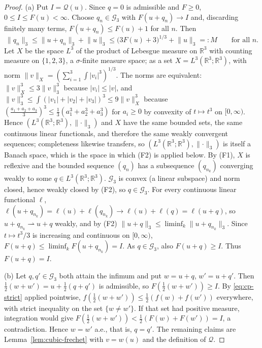 \documentclass[11pt]{article}
\theoremstyle{definition}
\theoremstyle{plain}
\newcommand{\R}{\mathbb R}
\newcommand{\norm}[1]{\lVert #1\rVert}
\begin{document}
\begin{proof}
(a) Put $I=\mathcal Q(u)$.  Since $q=0$ is admissible and $F\ge0$,
$0\le I\le F(u)<\infty$.  Choose $q_n\in\mathcal G_3$ with
$F(u+q_n)\to I$ and, discarding finitely many terms,
$F(u+q_n)\le F(u)+1$ for all $n$.  Then
\[
 \norm{q_n}_3\le\norm{u+q_n}_3+\norm u_3
 \le\bigl(3F(u)+3\bigr)^{1/3}+\norm u_3=:M
 \qquad\text{for all }n .
\]
Let $X$ be the space $L^3$ of the product of Lebesgue measure on $\R^3$
with counting measure on $\{1,2,3\}$, a $\sigma$-finite measure space;
as a set $X=L^3(\R^3;\R^3)$, with norm
$\norm v_X=(\sum_{i=1}^3\int|v_i|^3)^{1/3}$.  The norms are equivalent:
$\norm v_X^3\le3\norm v_3^3$ because $|v_i|\le|v|$, and
$\norm v_3^3\le\int(|v_1|+|v_2|+|v_3|)^3\le9\norm v_X^3$ because
$(\frac{a_1+a_2+a_3}3)^3\le\frac13(a_1^3+a_2^3+a_3^3)$ for $a_i\ge0$ by
convexity of $t\mapsto t^3$ on $[0,\infty)$.  Hence
$(L^3(\R^3;\R^3),\norm\cdot_3)$ and $X$ have the same bounded sets, the
same continuous linear functionals, and therefore the same weakly
convergent sequences; completeness likewise transfers, so
$(L^3(\R^3;\R^3),\norm\cdot_3)$ is itself a Banach space, which is the
space in which (F2) is applied below.  By (F1), $X$ is reflexive and the
bounded sequence $(q_n)$ has a subsequence $(q_{n_k})$ converging weakly
to some $q\in L^3(\R^3;\R^3)$.  $\mathcal G_3$ is convex (a linear subspace) and
norm closed, hence weakly closed by (F2), so $q\in\mathcal G_3$.  For
every continuous linear functional $\ell$,
$\ell(u+q_{n_k})=\ell(u)+\ell(q_{n_k})\to\ell(u)+\ell(q)=\ell(u+q)$, so
$u+q_{n_k}\rightharpoonup u+q$ weakly, and by (F2)
$\norm{u+q}_3\le\liminf_k\norm{u+q_{n_k}}_3$.  Since $t\mapsto t^3/3$ is
increasing and continuous on $[0,\infty)$,
$F(u+q)\le\liminf_kF(u+q_{n_k})=I$.  As $q\in\mathcal G_3$, also
$F(u+q)\ge I$.  Thus $F(u+q)=I$.

(b) Let $q,q'\in\mathcal G_3$ both attain the infimum and put $w=u+q$,
$w'=u+q'$.  Then $\frac12(w+w')=u+\frac12(q+q')$ is admissible, so
$F(\frac12(w+w'))\ge I$.  By \eqref{eq:cp-strict} applied pointwise,
$f(\frac12(w+w'))\le\frac12(f(w)+f(w'))$ everywhere, with strict
inequality on the set $\{w\ne w'\}$.  If that set had positive measure,
integration would give $F(\frac12(w+w'))<\frac12(F(w)+F(w'))=I$, a
contradiction.  Hence $w=w'$ a.e., that is, $q=q'$.  The remaining claims
are Lemma~\ref{lem:cubic-frechet} with $v=w(u)$ and the definition of
$\mathcal Q$.


\end{proof}
\end{document}
